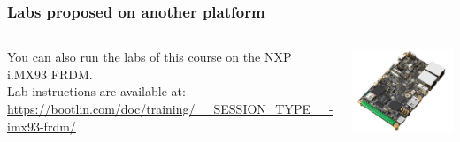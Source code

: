 \begin{frame}
\frametitle{Labs proposed on another platform}
  \begin{columns}
    You can also run the labs of this course on the NXP i.MX93 FRDM.\\
    \vspace{1em}
    Lab instructions are available at:\\
    {\small \url{https://bootlin.com/doc/training/__SESSION_TYPE__-imx93-frdm/}}
    \begin{center}
      \includegraphics[width=\textwidth]{../slides/imx93-frdm-board/imx93-frdm.png}\\
    \end{center}
  \end{columns}
\end{frame}
